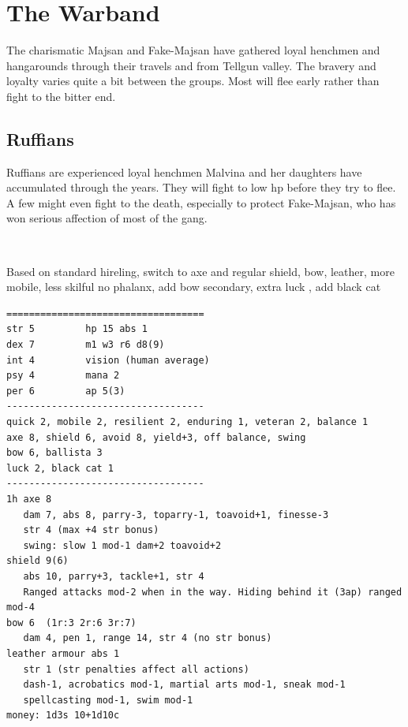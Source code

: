\clearpage
{}
\section*{The Warband}
The charismatic Majsan and Fake-Majsan have gathered loyal henchmen and hangarounds through their travels and from Tellgun valley. The bravery and loyalty varies quite a bit between the groups. Most will flee early rather than fight to the bitter end.



\begin{samepage}
\subsection*{Ruffians}
Ruffians are experienced loyal henchmen Malvina and her daughters have accumulated through the years. They will fight to low hp before they try to flee. A few might even fight to the death, especially to protect Fake-Majsan, who has won serious affection of most of the gang.

\

Based on standard hireling, switch to axe and regular shield, bow, leather,
more mobile, less skilful no phalanx,
add bow secondary, extra luck , add black cat
\small \begin{verbatim}
===================================
str 5         hp 15 abs 1
dex 7         m1 w3 r6 d8(9)
int 4         vision (human average)
psy 4         mana 2
per 6         ap 5(3)
-----------------------------------
quick 2, mobile 2, resilient 2, enduring 1, veteran 2, balance 1
axe 8, shield 6, avoid 8, yield+3, off balance, swing
bow 6, ballista 3
luck 2, black cat 1
-----------------------------------
1h axe 8
   dam 7, abs 8, parry-3, toparry-1, toavoid+1, finesse-3
   str 4 (max +4 str bonus)
   swing: slow 1 mod-1 dam+2 toavoid+2
shield 9(6)
   abs 10, parry+3, tackle+1, str 4
   Ranged attacks mod-2 when in the way. Hiding behind it (3ap) ranged mod-4
bow 6  (1r:3 2r:6 3r:7)
   dam 4, pen 1, range 14, str 4 (no str bonus)
leather armour abs 1
   str 1 (str penalties affect all actions)
   dash-1, acrobatics mod-1, martial arts mod-1, sneak mod-1
   spellcasting mod-1, swim mod-1
money: 1d3s 10+1d10c
\end{verbatim} \normalsize
\end{samepage}


